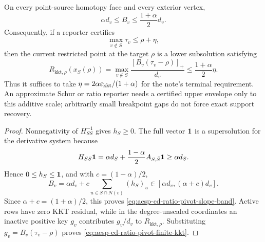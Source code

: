 \begin{corollary}
\label{cor:aesp-cd-ratio-pivot-finite-stop}
On every point-source homotopy face and every exterior vertex,
\begin{equation}
 \alpha d_v\leq B_v\leq\frac{1+\alpha}{2}d_v.
 \label{eq:aesp-cd-ratio-pivot-slope-band}
\end{equation}
Consequently, if a reporter certifies
\begin{equation*}
 \max_{v\notin S}\tau_v\leq\rho+\eta,
\end{equation*}
then the current restricted point at the target \(\rho\) is a lower
subsolution satisfying
\begin{equation}
 R_{\mathrm{kkt},\rho}(x_S(\rho))
 =\max_{v\notin S}\frac{[B_v(\tau_v-\rho)]_+}{d_v}
 \leq\frac{1+\alpha}{2}\eta.
 \label{eq:aesp-cd-ratio-pivot-finite-kkt}
\end{equation}
Thus it suffices to take
\(\eta=2\alpha\varepsilon_{\mathrm{kkt}}/(1+\alpha)\) for the note's terminal requirement.
An approximate Schur or ratio reporter needs a certified upper envelope only
to this additive scale; arbitrarily small breakpoint gaps do not force exact
support recovery.
\end{corollary}

\begin{proof}
Nonnegativity of \(H_{SS}^{-1}\) gives \(h_S\geq0\).  The full vector
\(\mathbf{1}\) is a supersolution for the derivative system because
\begin{equation*}
 H_{SS}\mathbf{1}
 =\alpha d_S+\frac{1-\alpha}{2}A_{S,\bar S}\mathbf{1}
 \geq\alpha d_S.
\end{equation*}
Hence \(0\leq h_S\leq\mathbf{1}\), and with
\(c=(1-\alpha)/2\),
\begin{equation*}
 B_v=\alpha d_v+c\sum_{u\in S\cap N(v)}(h_S)_u
 \in[\alpha d_v,(\alpha+c)d_v].
\end{equation*}
Since \(\alpha+c=(1+\alpha)/2\), this proves
\cref{eq:aesp-cd-ratio-pivot-slope-band}.  Active rows have zero KKT
residual, while in the degree-unscaled coordinates an inactive positive key
\(g_v\) contributes \(g_v/d_v\) to
\(R_{\mathrm{kkt},\rho}\).  Substituting
\(g_v=B_v(\tau_v-\rho)\) proves
\cref{eq:aesp-cd-ratio-pivot-finite-kkt}.
\end{proof}

